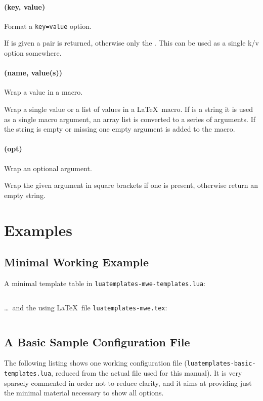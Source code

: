 \documentclass{scrartcl}
\begin{document}
\paragraph{ (key, value)}

Format a \texttt{key=value} option.

If  is given a \value{key=value} pair is returned, otherwise only
the .  This can be used as a single k/v option somewhere.


\paragraph{ (name, value(s))}

Wrap a value in a macro.

Wrap a single value or a list of values in a \LaTeX\ macro. If  is
a string it is used as a single macro argument, an array list is converted to a
series of arguments. If the string is empty or missing one empty argument is
added to the macro.


\paragraph{ (opt)}

Wrap an optional argument.

Wrap the given argument in square brackets if one is present, otherwise return
an empty string.


\pagebreak
\section{Examples}
\label{sec:examples}

\subsection{Minimal Working Example}
\label{sec:mwe}

\noindent
A minimal template table in \texttt{luatemplates-mwe-templates.lua}:

\inputminted[frame=lines]{lua}{luatemplates-mwe-templates.lua}

\noindent \dots\ and the using \LaTeX\ file \texttt{luatemplates-mwe.tex}:

\inputminted[frame=lines]{tex}{luatemplates-mwe.tex}

\pagebreak


\subsection{A Basic Sample Configuration File}
\label{sec:basic-sample-config}

The following listing shows one working configuration file
(\texttt{luatemplates-basic-templates.lua}, reduced from the actual file used
for this manual). It is very sparsely commented in order not to reduce clarity,
and it aims at providing just the minimal material necessary to show all
options.

\inputminted{lua}{luatemplates-basic-templates.lua}

\enlargethispage*{4\baselineskip}
\end{document}
